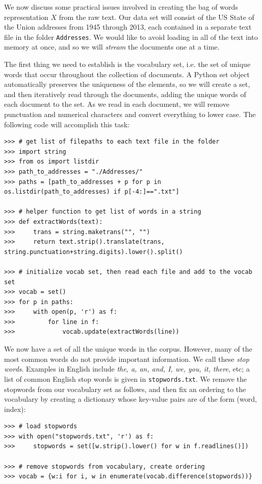 We now discuss some practical issues involved in creating the bag of words representation $X$ from the raw text.
Our data set will consist of the US State of the Union addresses from 1945 through 2013, each contained in a separate text file in the folder {\tt Addresses}.
We would like to avoid loading in all of the text into memory at once, and so we will \emph{stream} the documents one at a time.

The first thing we need to establish is the vocabulary set, i.e. the set of unique words that occur throughout the collection of documents.
A Python set object automatically preserves the uniqueness of the elements, so we will create a set, and then iteratively read through the documents, adding the unique words of each
document to the set. As we read in each document, we will remove punctuation and numerical characters and convert everything to lower case.
The following code will accomplish this task:
\begin{lstlisting}
>>> # get list of filepaths to each text file in the folder
>>> import string
>>> from os import listdir
>>> path_to_addresses = "./Addresses/"
>>> paths = [path_to_addresses + p for p in os.listdir(path_to_addresses) if p[-4:]==".txt"]

>>> # helper function to get list of words in a string
>>> def extractWords(text):
>>>     trans = string.maketrans("", "")
>>>     return text.strip().translate(trans, string.punctuation+string.digits).lower().split()

>>> # initialize vocab set, then read each file and add to the vocab set
>>> vocab = set()
>>> for p in paths:
>>>     with open(p, 'r') as f:
>>>         for line in f:
>>>             vocab.update(extractWords(line))
\end{lstlisting}

We now have a set of all the unique words in the corpus. However, many of the most common words do not provide important information.
We call these \emph{stop words}. Examples in English include \emph{the, a, an, and, I, we, you, it, there}, etc;
a list of common English stop words is given in {\tt stopwords.txt}.
We remove the stopwords from our vocabulary set as follows, and then fix an ordering to the vocabulary by creating a dictionary
whose key-value pairs are of the form (word, index):
\begin{lstlisting}
>>> # load stopwords
>>> with open("stopwords.txt", 'r') as f:
>>>     stopwords = set([w.strip().lower() for w in f.readlines()])

>>> # remove stopwords from vocabulary, create ordering
>>> vocab = {w:i for i, w in enumerate(vocab.difference(stopwords))}
\end{lstlisting}

